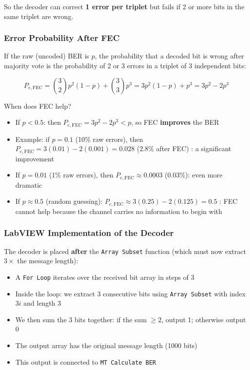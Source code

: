 So the decoder can correct \textbf{1 error per triplet} but fails if 2 or more bits in the same triplet are wrong.

\subsubsection{Error Probability After FEC}

If the raw (uncoded) BER is $p$, the probability that a decoded bit is wrong after majority vote is the probability of 2 or 3 errors in a triplet of 3 independent bits:

\begin{equation}
P_{e,\text{FEC}} = \binom{3}{2}p^2(1-p) + \binom{3}{3}p^3 = 3p^2(1-p) + p^3 = 3p^2 - 2p^3
\end{equation}

\begin{KeyBox}{When does FEC help?}
\begin{itemize}
\item If $p < 0.5$: then $P_{e,\text{FEC}} = 3p^2 - 2p^3 < p$, so FEC \textbf{improves} the BER
\item Example: if $p = 0.1$ (10\% raw errors), then $P_{e,\text{FEC}} = 3(0.01) - 2(0.001) = 0.028$ (2.8\% after FEC) : a significant improvement
\item If $p = 0.01$ (1\% raw errors), then $P_{e,\text{FEC}} \approx 0.0003$ (0.03\%): even more dramatic
\item If $p \approx 0.5$ (random guessing): $P_{e,\text{FEC}} \approx 3(0.25) - 2(0.125) = 0.5$ : FEC cannot help because the channel carries no information to begin with
\end{itemize}
\end{KeyBox}

\subsubsection{LabVIEW Implementation of the Decoder}

The decoder is placed \textbf{after} the \texttt{Array Subset} function (which must now extract $3 \times$ the message length):

\begin{itemize}
\item A \texttt{For Loop} iterates over the received bit array in steps of 3
\item Inside the loop: we extract 3 consecutive bits using \texttt{Array Subset} with index $3i$ and length 3
\item We then sum the 3 bits together: if the sum $\geq 2$, output 1; otherwise output 0
\item The output array has the original message length (1000 bits)
\item This output is connected to \texttt{MT Calculate BER}
\end{itemize}

